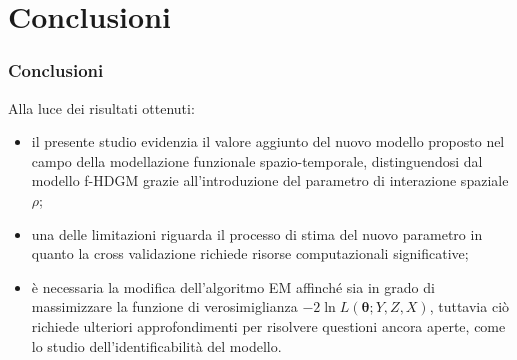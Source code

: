 \section{Conclusioni}
\begin{frame}
	\frametitle{Conclusioni}
	
	Alla luce dei risultati ottenuti:
	\begin{itemize}
		\justifying
		\item il presente studio evidenzia il valore aggiunto del nuovo modello proposto nel campo della modellazione funzionale spazio-temporale, distinguendosi dal modello f-HDGM grazie all'introduzione del parametro di interazione spaziale $\rho$;
		\item una delle limitazioni riguarda il processo di stima del nuovo parametro in quanto la cross validazione richiede risorse computazionali significative;
		\item è necessaria la modifica dell'algoritmo EM affinché sia in grado di massimizzare la funzione di verosimiglianza $-2\ln L(\boldsymbol{\theta}; Y, Z, X)$, tuttavia ciò richiede ulteriori approfondimenti per risolvere questioni ancora aperte, come lo studio dell'identificabilità del modello.
	\end{itemize}	
\end{frame}

